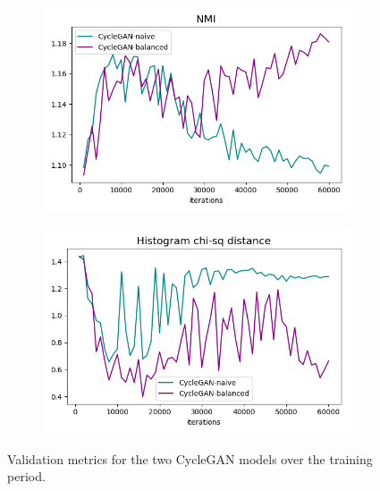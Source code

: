 \begin{figure}[h!]
{\begin{subfigure}{.4\textwidth}
            \includegraphics[width=\linewidth]{figures/Expt_2/gan_convergence/metric_val_nmi.png}
            \caption{}
            \label{fig:metric_val_nmi}
        \end{subfigure}
        \begin{subfigure}{.4\textwidth}
            \centering
            \includegraphics[width=\linewidth]{figures/Expt_2/gan_convergence/metric_val_histogram_chi2.png}
            \caption{}
            \label{fig:metric_val_histogram_chi2}
        \end{subfigure}
    }
    \caption{Validation metrics for the two CycleGAN models over the training period.}
    \label{fig:cyclegan_metrics}
\end{figure}{}

